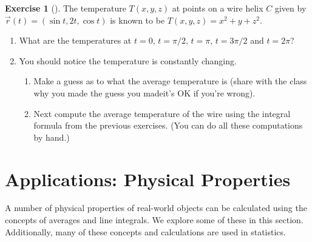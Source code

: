 \documentclass[10pt,]{book}
\theoremstyle{plain}
\theoremstyle{definition}
\theoremstyle{definition}
\theoremstyle{definition}
\theoremstyle{definition}
\newtheorem{exploration}[project]{Exercise}
\theoremstyle{definition}
\numberwithin{equation}{section}
\begin{document}
\begin{exploration}[]\label{exploration-213}
The temperature \(T(x,y,z)\) at points on a wire helix \(C\) given by \(\vec r(t) = (\sin t, 2t, \cos t)\) is known to be \(T(x,y,z)=x^2+y+z^2\).%
\begin{enumerate}[font=\bfseries,label=(\alph*),ref=\alph*]
\item\label{task-558} What are the temperatures at \(t=0\), \(t=\pi/2\), \(t=\pi\), \(t=3\pi/2\) and \(t=2\pi\)?%
\item\label{task-559} You should notice the temperature is constantly changing.%
\begin{enumerate}[font=\bfseries,label=(\roman*),ref=\theenumi.\roman*]
\item\label{task-560} Make a guess as to what the average temperature is (share with the class why you made the guess you made\textemdash{}it's OK if you're wrong).%
\item\label{task-561} Next compute the average temperature of the wire using the integral formula from the previous exercises. (You can do all these computations by hand.)%
\end{enumerate}
\end{enumerate}
\end{exploration}
\typeout{************************************************}
\typeout{************************************************}
\section[{Applications: Physical Properties}]{Applications: Physical Properties}\label{ch09_05_physicalproperties}
A number of physical properties of real-world objects can be calculated using the concepts of averages and line integrals. We explore some of these in this section. Additionally, many of these concepts and calculations are used in statistics.%
\typeout{************************************************}
\typeout{************************************************}
\end{document}
